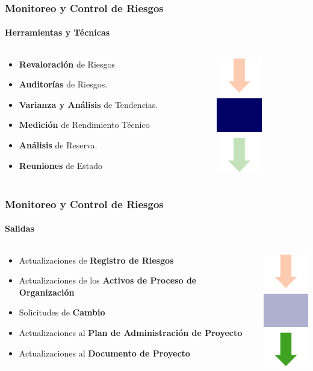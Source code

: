 \frame
{
\frametitle{Monitoreo y Control de Riesgos}
\framesubtitle{Herramientas y Técnicas}
\begin{columns}
	\begin{column}{0.8\textwidth}
		\begin{itemize}
			\item <1-> \textbf{Revaloración} de Riesgos
			\item <2-> \textbf{Auditorías} de Riesgos.
			\item <3-> \textbf{Varianza y Análisis} de Tendencias.
			\item <4-> \textbf{Medición} de Rendimiento Técnico
			\item <5-> \textbf{Análisis} de Reserva.
			\item <6-> \textbf{Reuniones} de Estado
		\end{itemize}
	\end{column}
	\begin{column}{0.2\textwidth}
		\includegraphics[width=2cm]{img/tools}
	\end{column}
\end{columns}
}

\frame
{
\frametitle{Monitoreo y Control de Riesgos}
\framesubtitle{Salidas}
\begin{columns}
	\begin{column}{0.8\textwidth}
		\begin{itemize}
			\item <1-> Actualizaciones de \textbf{Registro de Riesgos}
			\item <2-> Actualizaciones de los \textbf{Activos de Proceso de Organización}
			\item <3-> Solicitudes de \textbf{Cambio}
			\item <4-> Actualizaciones al \textbf{Plan de Administración de Proyecto}
			\item <5-> Actualizaciones al \textbf{Documento de Proyecto}
		\end{itemize}
	\end{column}
	\begin{column}{0.2\textwidth}
		\includegraphics[width=2cm]{img/output}
	\end{column}
\end{columns}

}
